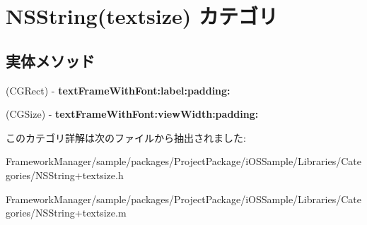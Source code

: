 \hypertarget{category_n_s_string_07textsize_08}{}\section{N\+S\+String(textsize) カテゴリ}
\label{category_n_s_string_07textsize_08}
\subsection*{実体メソッド}
\begin{DoxyCompactItemize}
\item 
\hypertarget{category_n_s_string_07textsize_08_a341a162eb02f4e3c248569d0b7ade454}{}(C\+G\+Rect) -\/ {\bfseries text\+Frame\+With\+Font\+:label\+:padding\+:}\label{category_n_s_string_07textsize_08_a341a162eb02f4e3c248569d0b7ade454}

\item 
\hypertarget{category_n_s_string_07textsize_08_a738f2b427211cdd873741e2390dda29e}{}(C\+G\+Size) -\/ {\bfseries text\+Frame\+With\+Font\+:view\+Width\+:padding\+:}\label{category_n_s_string_07textsize_08_a738f2b427211cdd873741e2390dda29e}

\end{DoxyCompactItemize}


このカテゴリ詳解は次のファイルから抽出されました\+:\begin{DoxyCompactItemize}
\item 
Framework\+Manager/sample/packages/\+Project\+Package/i\+O\+S\+Sample/\+Libraries/\+Categories/N\+S\+String+textsize.\+h\item 
Framework\+Manager/sample/packages/\+Project\+Package/i\+O\+S\+Sample/\+Libraries/\+Categories/N\+S\+String+textsize.\+m\end{DoxyCompactItemize}

